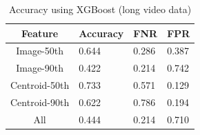 \begin{table}[!b]
  \centering
	\caption{Accuracy using XGBoost (long video data)}
		\begin{tabular}{clll} \hline
			Feature       & Accuracy & FNR   & FPR   \\ \hline \hline
			Image-50th    & 0.644    & 0.286 & 0.387 \\
			Image-90th    & 0.422    & 0.214 & 0.742 \\
			Centroid-50th & 0.733    & 0.571 & 0.129 \\
			Centroid-90th & 0.622    & 0.786 & 0.194 \\
			All           & 0.444    & 0.214 & 0.710 \\ \hline
		\end{tabular}
	\label{result_xg_test}
\end{table}